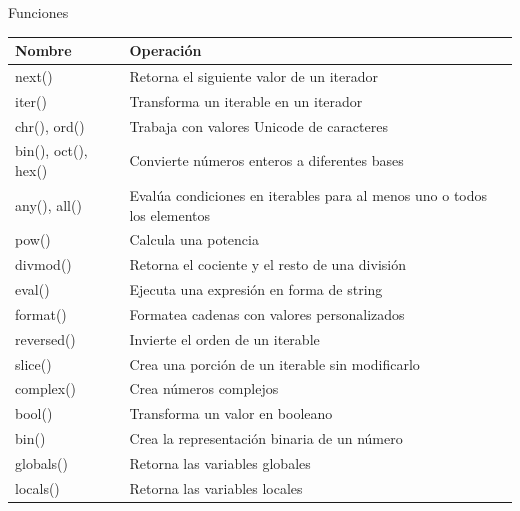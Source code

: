 \documentclass[11pt]{beamer}
\begin{document}
\begin{frame}{Funciones}
	\scriptsize
	\begin{tabularx}{\linewidth}{>{\raggedright\arraybackslash}p{3.5cm} X}
		\toprule
		\textbf{Nombre} & \textbf{Operación} \\
		\midrule
		next() & Retorna el siguiente valor de un iterador \\
		iter() & Transforma un iterable en un iterador \\
		chr(), ord() & Trabaja con valores Unicode de caracteres \\
		bin(), oct(), hex() & Convierte números enteros a diferentes bases \\
		any(), all() & Evalúa condiciones en iterables para al menos uno o todos los elementos \\
		pow() & Calcula una potencia \\
		divmod() & Retorna el cociente y el resto de una división \\
		eval() & Ejecuta una expresión en forma de string \\
		format() & Formatea cadenas con valores personalizados \\
		reversed() & Invierte el orden de un iterable \\
		slice() & Crea una porción de un iterable sin modificarlo \\
		complex() & Crea números complejos \\
		bool() & Transforma un valor en booleano \\
		bin() & Crea la representación binaria de un número \\
		globals() &  Retorna las variables globales \\
		locals() & Retorna las variables locales \\
		\bottomrule
	\end{tabularx}
\end{frame}
\end{document}
